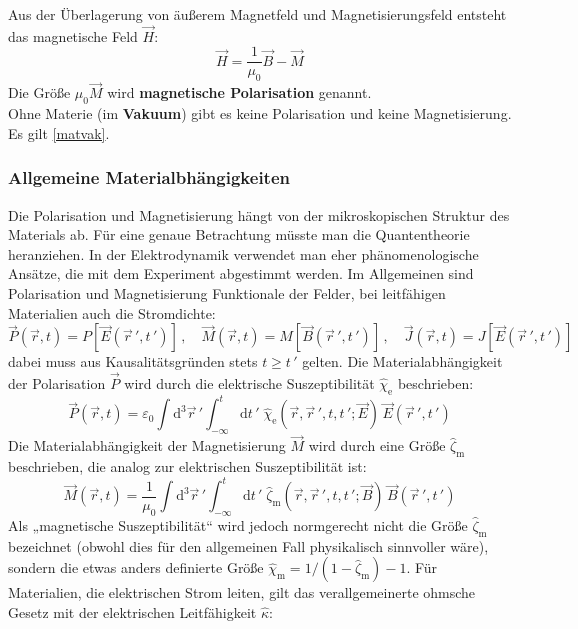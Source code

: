  Aus der Überlagerung von äußerem Magnetfeld und Magnetisierungsfeld entsteht das magnetische Feld $\vec H$:
 \begin{equation}\vec H= \frac{1}{\mu_0}\vec B - \vec M\end{equation}
 Die Größe $\mu_0 \vec M$ wird \textbf{magnetische Polarisation} genannt.\\
 Ohne Materie (im \textbf{Vakuum}) gibt es keine Polarisation und keine Magnetisierung.
 Es gilt \ref{matvak}.
\subsubsection{Allgemeine Materialbhängigkeiten}
 Die Polarisation und Magnetisierung hängt von der mikroskopischen Struktur des Materials ab. Für eine genaue Betrachtung müsste man die Quantentheorie heranziehen. In der Elektrodynamik verwendet man eher phänomenologische Ansätze, die mit dem Experiment abgestimmt werden. Im Allgemeinen sind Polarisation und Magnetisierung Funktionale der Felder, bei leitfähigen Materialien auch die Stromdichte:
\begin{equation}\vec{P}(\vec{r},t)=P\left[\vec{E}(\vec{r}\,',t\,')\right]\, ,\quad \vec{M}(\vec{r},t)=M\left[\vec{B}(\vec{r}\,',t\,')\right]\, ,\quad \vec{J}(\vec{r},t)=J\left[\vec{E}(\vec{r}\,',t\,')\right]\end{equation}
 dabei muss aus Kausalitätsgründen stets $t\geq t\,'$ gelten.
 Die Materialabhängigkeit der Polarisation $\vec P$ wird durch die elektrische Suszeptibilität $\hat{\chi}_{\mathrm{e}}$ beschrieben: 
 \begin{equation}\label{polallg}\vec{P}(\vec{r},t)=\varepsilon_0\int \mathrm d^3\vec{r}\,'\int_{-\infty}^t\mathrm dt\,'\;\hat{\chi}_{\mathrm{e}}(\vec{r},\vec{r}\,',t,t\,';\vec{E})\,\vec{E}(\vec{r}\,',t\,')\end{equation}
 Die Materialabhängigkeit der Magnetisierung $\vec M$ wird durch eine Größe $\hat{\zeta}_{\mathrm m}$ beschrieben, die analog zur elektrischen Suszeptibilität ist:
 \begin{equation}\vec{M}(\vec{r},t)=\frac{1}{\mu_0}\int \mathrm d^3\vec{r}\,'\int_{-\infty}^t\mathrm dt\,'\;\hat{\zeta}_{\mathrm m}(\vec{r},\vec{r}\,',t,t\,';\vec{B})\,\vec{B}(\vec{r}\,',t\,')\end{equation}
 Als „magnetische Suszeptibilität“ wird jedoch normgerecht nicht die Größe $\hat{\zeta}_{\mathrm m}$ bezeichnet (obwohl dies für den allgemeinen Fall physikalisch sinnvoller wäre), sondern die etwas anders definierte Größe $\hat{\chi}_{\mathrm m} = 1/(1-\hat{\zeta}_{\mathrm m})-1$.  Für Materialien, die elektrischen Strom leiten, gilt das verallgemeinerte ohmsche Gesetz mit der elektrischen Leitfähigkeit $\hat{\kappa}$:
